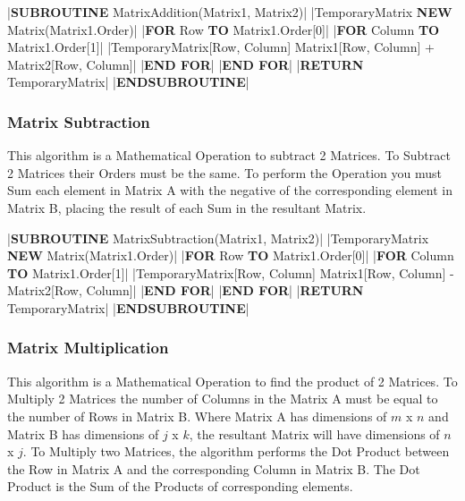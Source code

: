 \begin{flushleft}
                \vspace{0.2cm}
                \begin{pseudocode}
|\textbf{SUBROUTINE} MatrixAddition(Matrix1, Matrix2)|
    |TemporaryMatrix \leftarrow \textbf{NEW} Matrix(Matrix1.Order)|
    |\textbf{FOR} Row  \textbf{TO} Matrix1.Order[0]|
        |\textbf{FOR} Column  \textbf{TO} Matrix1.Order[1]|
            |TemporaryMatrix[Row, Column] \leftarrow Matrix1[Row, Column] + Matrix2[Row, Column]|
        |\textbf{END FOR}|
    |\textbf{END FOR}|
    |\textbf{RETURN} TemporaryMatrix|
|\textbf{ENDSUBROUTINE}|
                \end{pseudocode}

                \vspace{0.5cm}
            \subsubsection{Matrix Subtraction}
                This algorithm is a Mathematical Operation to subtract 2 Matrices. To Subtract 2 Matrices their Orders
                must be the same. To perform the Operation you must Sum each element in Matrix A with the negative of the 
                corresponding element in Matrix B, placing the result of each Sum in the resultant Matrix.

                \vspace{0.2cm}
                \begin{pseudocode}
|\textbf{SUBROUTINE} MatrixSubtraction(Matrix1, Matrix2)|
    |TemporaryMatrix \leftarrow \textbf{NEW} Matrix(Matrix1.Order)|
    |\textbf{FOR} Row  \textbf{TO} Matrix1.Order[0]|
        |\textbf{FOR} Column  \textbf{TO} Matrix1.Order[1]|
            |TemporaryMatrix[Row, Column] \leftarrow Matrix1[Row, Column] - Matrix2[Row, Column]|
        |\textbf{END FOR}|
    |\textbf{END FOR}|
    |\textbf{RETURN} TemporaryMatrix|
|\textbf{ENDSUBROUTINE}|
                \end{pseudocode}

                \vspace{0.5cm}
            \subsubsection{Matrix Multiplication}
                This algorithm is a Mathematical Operation to find the product of 2 Matrices. To Multiply 2 Matrices
                the number of Columns in the Matrix A must be equal to the number of Rows in Matrix B. Where Matrix A has
                dimensions of $m$ x $n$ and Matrix B has dimensions of $j$ x $k$, the resultant Matrix will have dimensions of 
                $n$ x $j$. To Multiply two Matrices, the algorithm performs the Dot Product between the Row in Matrix A and the 
                corresponding Column in Matrix B. The Dot Product is the Sum of the Products of corresponding elements.


\end{flushleft}

